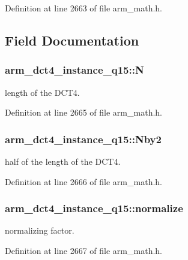 Definition at line 2663 of file arm\-\_\-math.\-h.



\subsection{Field Documentation}
\hypertarget{structarm__dct4__instance__q15_a53d24009bb9b2e93d0aa07db7f1a6c25}{
\subsubsection[{N}]{ arm\-\_\-dct4\-\_\-instance\-\_\-q15\-::\-N}}\label{structarm__dct4__instance__q15_a53d24009bb9b2e93d0aa07db7f1a6c25}
length of the D\-C\-T4. 

Definition at line 2665 of file arm\-\_\-math.\-h.

\hypertarget{structarm__dct4__instance__q15_af43dcbbc2fc661ffbc525afe3dcbd7da}{
\subsubsection[{Nby2}]{ arm\-\_\-dct4\-\_\-instance\-\_\-q15\-::\-Nby2}}\label{structarm__dct4__instance__q15_af43dcbbc2fc661ffbc525afe3dcbd7da}
half of the length of the D\-C\-T4. 

Definition at line 2666 of file arm\-\_\-math.\-h.

\hypertarget{structarm__dct4__instance__q15_a197098140d68e89a08f7a249003a0b86}{
\subsubsection[{normalize}]{ arm\-\_\-dct4\-\_\-instance\-\_\-q15\-::normalize}}\label{structarm__dct4__instance__q15_a197098140d68e89a08f7a249003a0b86}
normalizing factor. 

Definition at line 2667 of file arm\-\_\-math.\-h.

